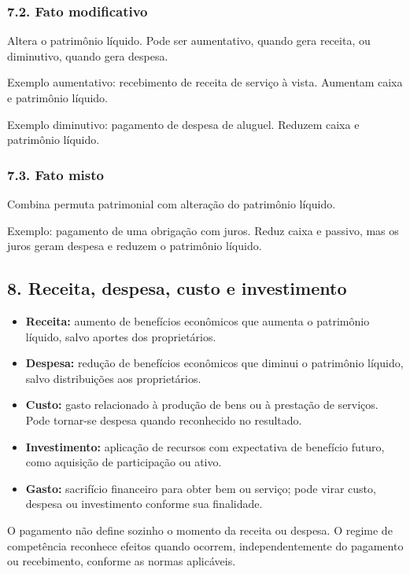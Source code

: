 \documentclass[11pt,a4paper]{article}
\begin{document}
\subsubsection*{7.2. Fato modificativo}

Altera o patrimônio líquido. Pode ser aumentativo, quando gera receita, ou diminutivo, quando gera despesa.

Exemplo aumentativo: recebimento de receita de serviço à vista. Aumentam caixa e patrimônio líquido.

Exemplo diminutivo: pagamento de despesa de aluguel. Reduzem caixa e patrimônio líquido.

\subsubsection*{7.3. Fato misto}

Combina permuta patrimonial com alteração do patrimônio líquido.

Exemplo: pagamento de uma obrigação com juros. Reduz caixa e passivo, mas os juros geram despesa e reduzem o patrimônio líquido.

\subsection*{8. Receita, despesa, custo e investimento}

\begin{itemize}
  \item \textbf{Receita:} aumento de benefícios econômicos que aumenta o patrimônio líquido, salvo aportes dos proprietários.
  \item \textbf{Despesa:} redução de benefícios econômicos que diminui o patrimônio líquido, salvo distribuições aos proprietários.
  \item \textbf{Custo:} gasto relacionado à produção de bens ou à prestação de serviços. Pode tornar-se despesa quando reconhecido no resultado.
  \item \textbf{Investimento:} aplicação de recursos com expectativa de benefício futuro, como aquisição de participação ou ativo.
  \item \textbf{Gasto:} sacrifício financeiro para obter bem ou serviço; pode virar custo, despesa ou investimento conforme sua finalidade.
\end{itemize}

O pagamento não define sozinho o momento da receita ou despesa. O regime de competência reconhece efeitos quando ocorrem, independentemente do pagamento ou recebimento, conforme as normas aplicáveis.
\end{document}
